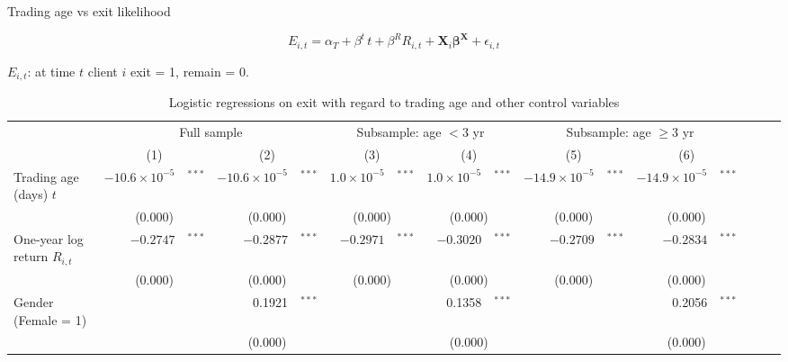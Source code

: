\documentclass{beamer}
\begin{document}
\begin{frame}[shrink=10]{Trading age vs exit likelihood}

	\begin{equation}
	\label{eq:rregress}
E_{i,t} = \alpha_T + \beta^t \, t + \beta^R R_{i,t} + \bm{X}_i \bm{\beta}^{\bm{X}} + \epsilon_{i,t}
	\end{equation}

$E_{i,t}$: at time $t$ client $i$ exit = 1, remain = 0.

	\begin{table}[h!]
		\centering
		\caption{Logistic regressions on exit with regard to trading age and other control variables}
		\tiny
		\setlength{\tabcolsep}{0pt}
\begin{tabular}{@{}l@{}r@{}lr@{}lr@{}lr@{}lr@{}lr@{}lr@{}l@{}l@{}}
	\toprule
	& \multicolumn{4}{c}{Full sample} & \multicolumn{4}{c}{Subsample: age $< 3$ yr} & \multicolumn{4}{c}{Subsample: age $\geq 3$ yr}  \\
	& \multicolumn{2}{c}{(1)} & \multicolumn{2}{c}{(2)} & \multicolumn{2}{c}{(3)} & \multicolumn{2}{c}{(4)} & \multicolumn{2}{c}{(5)} & \multicolumn{2}{c}{(6)} \\
	\cmidrule(lr){2-5}  \cmidrule(lr){6-9}   \cmidrule(lr){10-13}
	Trading age (days) $t$ & $-10.6 \times 10^{-5}$ & $^{***}$   & $-10.6 \times 10^{-5}$ & $^{***}$   & $1.0 \times 10^{-5}$ & $^{***}$   & $1.0 \times 10^{-5}$ & $^{***}$   & $-14.9\times 10^{-5}$ & $^{***}$   & $-14.9\times 10^{-5}$ & $^{***}$ \\
	& \multicolumn{2}{c}{(0.000)} & \multicolumn{2}{c}{(0.000)} & \multicolumn{2}{c}{(0.000)} & \multicolumn{2}{c}{(0.000)} & \multicolumn{2}{c}{(0.000)} & \multicolumn{2}{c}{(0.000)} \\
	One-year log return $R_{i,t}$ & $-0.2747$ & $^{***}$   & $-0.2877$ & $^{***}$   & $-0.2971$ & $^{***}$   & $-0.3020$ & $^{***}$   & $-0.2709$ & $^{***}$   & $-0.2834$ & $^{***}$ \\
	& \multicolumn{2}{c}{(0.000)} & \multicolumn{2}{c}{(0.000)} & \multicolumn{2}{c}{(0.000)} & \multicolumn{2}{c}{(0.000)} & \multicolumn{2}{c}{(0.000)} & \multicolumn{2}{c}{(0.000)} \\
	Gender (Female = 1) &       &       & 0.1921 & $^{***}$   &       &       & 0.1358 & $^{***}$   &       &       & 0.2056 & $^{***}$ \\
	& \multicolumn{2}{c}{} & \multicolumn{2}{c}{(0.000)} & \multicolumn{2}{c}{} & \multicolumn{2}{c}{(0.000)} & \multicolumn{2}{c}{} & \multicolumn{2}{c}{(0.000)} \\

\end{tabular}
\end{table}
\end{frame}
\end{document}
